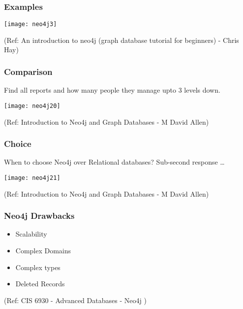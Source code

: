 \begin{frame}[fragile]\frametitle{Examples}


\begin{center}
\texttt{[image: neo4j3]}
\end{center}	

{\tiny (Ref: An introduction to neo4j (graph database tutorial for beginners) - Chris Hay)}

\end{frame}

\begin{frame}[fragile]\frametitle{Comparison}
Find all reports and how many people they manage upto 3 levels down.

\begin{center}
\texttt{[image: neo4j20]}
\end{center}	    

{\tiny (Ref: Introduction to Neo4j and Graph Databases
 - M David Allen)}

\end{frame}

\begin{frame}[fragile]\frametitle{Choice}
When to choose Neo4j over Relational databases? Sub-second response \ldots


\begin{center}
\texttt{[image: neo4j21]}
\end{center}	    

{\tiny (Ref: Introduction to Neo4j and Graph Databases
 - M David Allen)}

\end{frame}

\begin{frame}\frametitle{Neo4j Drawbacks}


\begin{itemize}
\item  Scalability
\item   Complex Domains
\item   Complex types
\item   Deleted Records
\end{itemize}

 

{\tiny (Ref: CIS 6930 - Advanced Databases - Neo4j )}
\end{frame}

